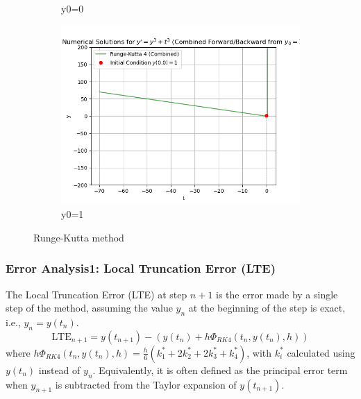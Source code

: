 \documentclass{article}
\begin{document}
\begin{figure}[htb]
\begin{subfigure}[b]{0.3\linewidth}
        \caption{y0=0} %
        \label{fig:kutta0} %
    \end{subfigure}
    \hfill %
    \begin{subfigure}[b]{0.3\linewidth}
        \centering
        \includegraphics[width=\linewidth]{pic/kutta1.png}
        \caption{y0=1} %
        \label{fig:kutta1} %
    \end{subfigure}

    \caption{Runge-Kutta method} %
    \label{fig:three_kutta_images} %
\end{figure}




\subsubsection{Error Analysis1: Local Truncation Error (LTE)}

The Local Truncation Error (LTE) at step $n+1$ is the error made by a single step of the method, assuming the value $y_n$ at the beginning of the step is exact, i.e., $y_n = y(t_n)$.
$$ \text{LTE}_{n+1} = y(t_{n+1}) - \left( y(t_n) + h \Phi_{RK4}(t_n, y(t_n), h) \right) $$
where $h \Phi_{RK4}(t_n, y(t_n), h) = \frac{h}{6}(k_1^* + 2k_2^* + 2k_3^* + k_4^*)$, with $k_i^*$ calculated using $y(t_n)$ instead of $y_n$.
Equivalently, it is often defined as the principal error term when $y_{n+1}$ is subtracted from the Taylor expansion of $y(t_{n+1})$.
\end{document}
